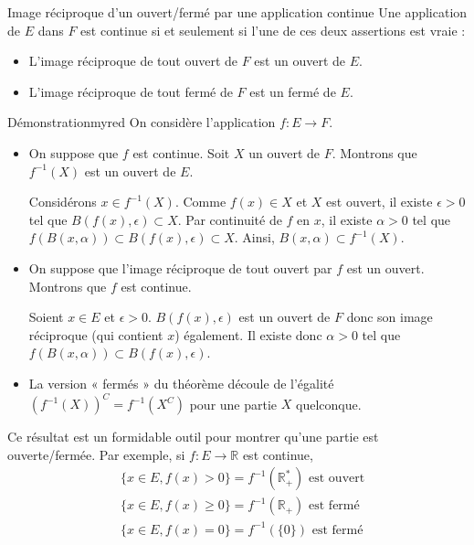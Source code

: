     \begin{theo}{Image réciproque d’un ouvert/fermé par une application continue}{}
        Une application de $E$ dans $F$ est continue si et seulement si l’une de ces deux assertions est vraie : 
        \begin{itemize}
            \item L’image réciproque de tout ouvert de $F$ est un ouvert de $E$.
            \item L’image réciproque de tout fermé de $F$ est un fermé de $E$.
        \end{itemize}
    \end{theo}

    \begin{demo}{Démonstration}{myred}
        On considère l’application $f : E \rightarrow F$.
        \begin{itemize}
            \item On suppose que $f$ est continue. Soit $X$ un ouvert de $F$. Montrons que $f^{-1}(X)$ est un ouvert de $E$.
            
            Considérons $x \in f^{-1}(X)$. Comme $f(x) \in X$ et $X$ est ouvert, il existe $\epsilon > 0$ tel que $B(f(x),\epsilon) \subset X$. Par continuité de $f$ en $x$, il existe $\alpha > 0$ tel que $f(B(x,\alpha)) \subset B(f(x),\epsilon) \subset X$. Ainsi, $B(x,\alpha) \subset f^{-1}(X)$.
            \item On suppose que l’image réciproque de tout ouvert par $f$ est un ouvert. Montrons que $f$ est continue.
            
            Soient $x \in E$ et $\epsilon > 0$. $B(f(x),\epsilon)$ est un ouvert de $F$ donc son image réciproque (qui contient $x$) également. Il existe donc $\alpha > 0$ tel que $f(B(x,\alpha)) \subset B(f(x),\epsilon)$.
            \item La version « fermés » du théorème découle de l’égalité $\left(f^{-1}(X)\right)^C = f^{-1}(X^C)$ pour une partie $X$ quelconque.
        \end{itemize}
    \end{demo}

    Ce résultat est un formidable outil pour montrer qu’une partie est ouverte/fermée. Par exemple, si $f : E \rightarrow \mathbb{R}$ est continue,
    \begin{align*}
        & \big\{ x \in E, f(x) > 0 \big\} = f^{-1}\left(\mathbb{R}_+^*\right) \text{ est ouvert} \\
        & \big\{ x \in E, f(x) \geq 0 \big\} = f^{-1}\left(\mathbb{R}_+\right) \text{ est fermé} \\
        &\big\{ x \in E, f(x) = 0 \big\} = f^{-1}\left(\{ 0 \}\right) \text{ est fermé}
    \end{align*}

